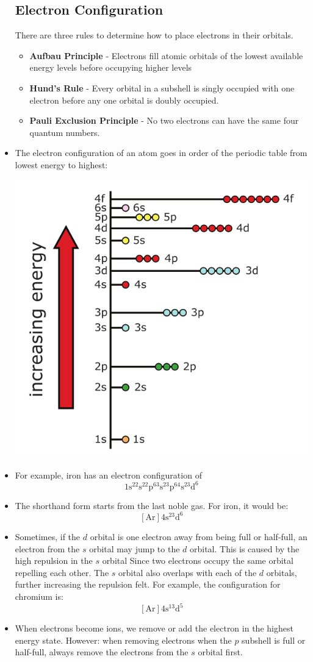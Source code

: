 \documentclass{article}
\numberwithin{equation}{section}
\theoremstyle{classic}
\begin{document}
\begin{itemize}
    \subsection{Electron Configuration}
    \begin{review}
        There are three rules to determine how to place electrons in their orbitals.
        \begin{itemize}
            \item \textbf{Aufbau Principle} - Electrons fill atomic orbitals of the lowest available energy levels before occupying higher levels
            \item \textbf{Hund's Rule} - Every orbital in a subshell is singly occupied with one electron before any one orbital is doubly occupied.
            \item \textbf{Pauli Exclusion Principle} - No two electrons can have the same four quantum numbers.
        \end{itemize}
    \end{review}
    \item The electron configuration of an atom goes in order of the periodic table from lowest energy to highest:
    \begin{center}\includegraphics[width=0.3\linewidth]{Q6.PNG}\end{center}
    \item For example, iron has an electron configuration of
    $$\mathrm{1s^22s^22p^63s^23p^64s^23d^6}$$
    \item The shorthand form starts from the last noble gas. For iron, it would be:
    $$\mathrm{[Ar]4s^23d^6}$$
    \item Sometimes, if the $d$ orbital is one electron away from being full or half-full, an electron from the $s$ orbital may jump to the $d$ orbital. This is caused by the high repulsion in the $s$ orbital Since two electrons occupy the same orbital repelling each other. The $s$ orbital also overlaps with each of the $d$ orbitals, further increasing the repulsion felt. For example, the configuration for chromium is:
    $$\mathrm{[Ar]4s^13d^5}$$
    \item When electrons become ions, we remove or add the electron in the highest energy state. However: when removing electrons when the $p$ subshell is full or half-full, always remove the electrons from the $s$ orbital first. 

\end{itemize}
\end{document}
